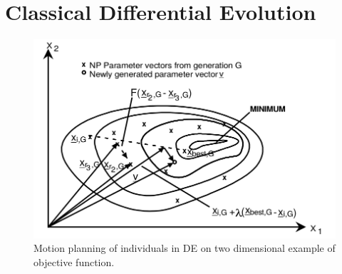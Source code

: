 \documentclass[a4paper,twoside]{article}
\begin{document}




\section{Classical Differential Evolution}

\begin{figure}[h!]
  \includegraphics[scale=0.25]{contourDE}
 \caption{Motion planning of individuals in DE on two dimensional example of objective function.}

  \label{fig:contourDE}
\end{figure}
\end{document}
